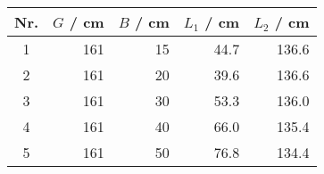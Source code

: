 \begin{tabular}{c|rrrr}
Nr. & $G$ / cm & $B$ / cm & $L_1$ / cm & $L_2$ / cm \\
\hline
1 & 161 & 15 & 44.7 & 136.6\\
2 & 161 & 20 & 39.6 & 136.6\\
3 & 161 & 30 & 53.3 & 136.0\\
4 & 161 & 40 & 66.0 & 135.4\\
5 & 161 & 50 & 76.8 & 134.4
\end{tabular}
